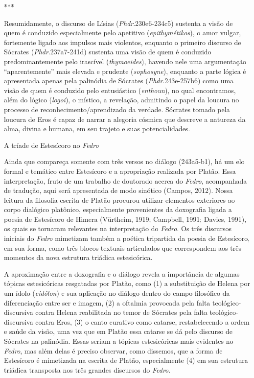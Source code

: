 ***

Resumidamente, o discurso de Lísias (\emph{Phdr}.230e6-234c5) sustenta a
visão de quem é conduzido especialmente pelo apetitivo
(\emph{epithymétikos}), o amor vulgar, fortemente ligado aos impulsos
mais violentos, enquanto o primeiro discurso de Sócrates
(\emph{Phdr}.237a7-241d) sustenta uma visão de quem é conduzido
predominantemente pelo irascível (\emph{thymoeides}), havendo nele uma
argumentação ``aparentemente'' mais elevada e prudente
(\emph{sophosyne}), enquanto a parte lógica é apresentada apenas pela
palinódia de Sócrates (\emph{Phdr}.243e-257b6) como uma visão de quem é
conduzido pelo entusiástico (\emph{enthoun}), no qual encontramos, além
do lógico (\emph{logoi}), o místico, a revelação, admitindo o papel da
loucura no processo de reconhecimento/aprendizado da verdade. Sócrates
tomado pela loucura de Eros é capaz de narrar a alegoria cósmica que
descreve a natureza da alma, divina e humana, em seu trajeto e suas
potencialidades.

A tríade de Estesícoro no \emph{Fedro}

Ainda que compareça somente com três versos no diálogo (243a5-b1), há um
elo formal e temático entre Estesícoro e a apropriação realizada por
Platão. Essa interpretação, fruto de um trabalho de doutorado acerca do
\emph{Fedro}, acompanhada de tradução, aqui será apresentada de modo
sinótico (Campos, 2012). Nossa leitura da filosofia escrita de Platão
procurou utilizar elementos exteriores ao corpo dialógico platônico,
especialmente provenientes da doxografia ligada a poesia de Estesícoro
de Himera (Vürtheim, 1919; Campbell, 1991; Davies, 1991), os quais se
tornaram relevantes na interpretação do \emph{Fedro}. Os três discursos
iniciais do \emph{Fedro} mimetizam também a poética tripartida da poesia
de Estesícoro, em sua forma, como três blocos textuais articulados que
correspondem aos três momentos da nova estrutura triádica estesicórica.

A aproximação entre a doxografia e o diálogo revela a importância de
algumas tópicas estesicóricas resgatadas por Platão, como (1) a
substituição de Helena por um ídolo (\emph{eidôlon}) e sua aplicação no
diálogo dentro do campo filosófico da diferenciação entre ser e imagem,
(2) a oftalmia provocada pela falta teológico-discursiva contra Helena
reabilitada no temor de Sócrates pela falta teológico-discursiva contra
Eros, (3) o canto curativo como catarse, restabelecendo a ordem e saúde
da visão, uma vez que em Platão essa catarse se dá pelo discurso de
Sócrates na palinódia. Essas seriam a tópicas estesicóricas mais
evidentes no \emph{Fedro}, mas além delas é preciso observar, como
dissemos, que a forma de Estesícoro é mimetizada na escrita de Platão,
especialmente (4) em sua estrutura triádica transposta nos três grandes
discursos do \emph{Fedro}.

